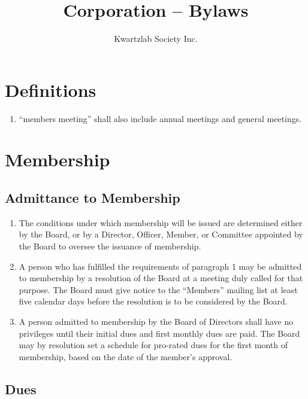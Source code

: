 \documentclass{article}
\title{Corporation – Bylaws}
\author{Kwartzlab Society Inc.}
\date{}
\begin{document}
\renewcommand{\thesection}{\Roman{section}}
\renewcommand{\thesubsection}{\Alph{subsection}}

\maketitle

\section{Definitions}

\begin{enumerate}
\item ``members meeting'' shall also include annual meetings and general meetings.
\end{enumerate}

\section{Membership}

\subsection{Admittance to Membership}

\begin{enumerate}
\item The conditions under which membership will be issued are determined either by the Board, or by a Director, Officer, Member, or Committee appointed by the Board to oversee the issuance of membership.
\item A person who has fulfilled the requirements of paragraph 1 may be admitted to membership by a resolution of the Board at a meeting duly called for that purpose. The Board must give notice to the ``Members'' mailing list at least five calendar days before the resolution is to be considered by the Board.
\item A person admitted to membership by the Board of Directors shall have no privileges until their initial dues and first monthly dues are paid. The Board may by resolution set a schedule for pro-rated dues for the first month of membership, based on the date of the member's approval.
\end{enumerate}

\subsection{Dues}
\end{document}
